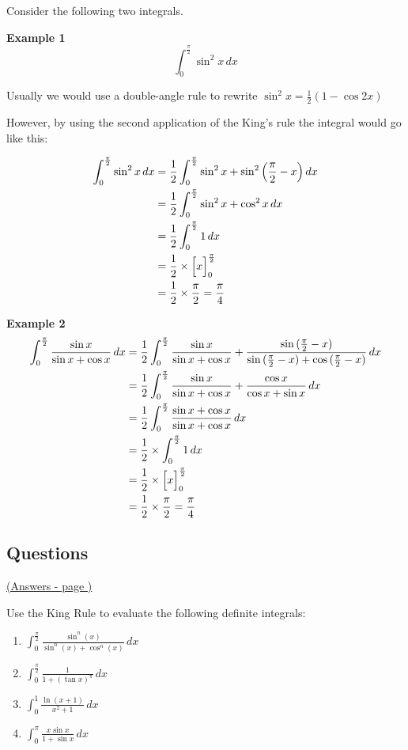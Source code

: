 \documentclass[../main.tex]{subfiles}
\begin{document}
Consider the following two integrals.

\textbf{Example 1}
\[\int_0^{\frac{\pi}{2}} \sin^2{x}\,dx\]

Usually we would use a double-angle rule to rewrite $\sin^2{x}=\frac{1}{2}(1-\cos{2x})$

However, by using the second application of the King's rule the integral would go like this:

\begin{align*}
    \int_0^{\frac{\pi}{2}} \sin^2{x}\,dx &= \frac{1}{2}\int_0^{\frac{\pi}{2}}\sin^2{x}+\sin^2{\Bigl(\frac{\pi}{2}-x\Bigr)}\,dx\\
    &= \frac{1}{2}\int_0^{\frac{\pi}{2}}\sin^2{x}+\cos^2{x}\,dx \\
    &=\frac{1}{2}\int_0^{\frac{\pi}{2}}1\,dx\\
    &=\frac{1}{2}\times \Bigl[x\Bigr]_0^{\frac{\pi}{2}}\\
    &=\frac{1}{2}\times \frac{\pi}{2}=\frac{\pi}{4}
\end{align*}

\textbf{Example 2}
\begin{align*}
    \int_0^{\frac{\pi}{2}} \frac{\sin{x}}{\sin{x}+\cos{x}}\,dx &= \frac{1}{2}\int_0^{\frac{\pi}{2}}\frac{\sin{x}}{\sin{x}+\cos{x}}+\frac{\sin{(\frac{\pi}{2}-x)}}{\sin{(\frac{\pi}{2}-x)}+\cos{(\frac{\pi}{2}-x)}}\,dx\\
    &=\frac{1}{2}\int_0^{\frac{\pi}{2}}\frac{\sin{x}}{\sin{x}+\cos{x}}+\frac{\cos{x}}{\cos{x}+\sin{x}}\,dx\\
    &=\frac{1}{2}\int_0^{\frac{\pi}{2}}\frac{\sin{x}+\cos{x}}{\sin{x}+\cos{x}}\,dx\\
    &=\frac{1}{2}\times \int_0^{\frac{\pi}{2}}1\,dx\\
    &=\frac{1}{2}\times \Bigl[x\Bigr]_0^{\frac{\pi}{2}}\\
    &=\frac{1}{2}\times \frac{\pi}{2}=\frac{\pi}{4}
\end{align*}

\pagebreak
\hypertarget{kingsrulelink}{\subsection*{Questions}}
\hyperlink{kingsruleanswers}{(Answers - page {\pageref*{Kings rule answers}})}

\label{Kings rule}

Use the King Rule to evaluate the following definite integrals:

\begin{enumerate}[itemsep=0.7cm]
    \item 
    $\int_0^{\frac{\pi}{2}}\frac{\sin^n{(x)}}{\sin^n{(x)}+\cos^n{(x)}}\,dx$

    \item 
    $\int_0^{\frac{\pi}{2}}\frac{1}{1+(\tan{x})^{\pi}}\,dx$

    \item 
    $\int_0^1 \frac{\ln{(x+1)}}{x^2+1}\,dx$

    \item 
    $\int_0^{\pi} \frac{x\sin{x}}{1+\sin{x}}\,dx$


\end{enumerate}


\pagebreak
\end{document}
